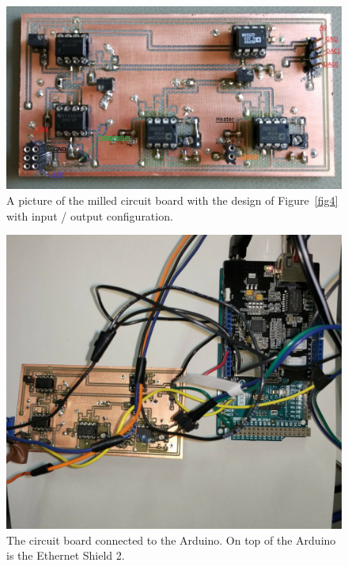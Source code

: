 \documentclass[12pt]{scrartcl}
\begin{document}
      \begin{figure}[H]
        \includegraphics[width = \textwidth]{boardbild.jpg}
        \caption{A picture of the milled circuit board with the design of Figure~\ref{fig4}
        with input / output configuration.}
        \label{fig5}
      \end{figure}
      \begin{figure}[H]
        \includegraphics[width = \textwidth]{boardwitharduino.jpg}
        \caption{The circuit board connected to the Arduino. On top of the
        Arduino is the Ethernet Shield 2. }
        \label{fig6}
      \end{figure}
\end{document}
